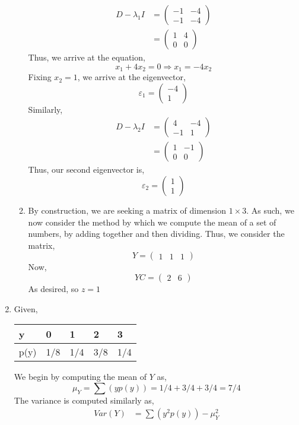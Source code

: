 \documentclass[letterpaper,10pt]{article}
\begin{document}
\begin{enumerate}
\begin{enumerate}
\begin{align*}
D-\lambda_1I &= \begin{pmatrix}
-1 & -4\\
-1 & -4
\end{pmatrix}\\
&= \begin{pmatrix}
1 & 4\\
0 & 0
\end{pmatrix}
\end{align*}
Thus, we arrive at the equation,
\[x_1+4x_2=0\Rightarrow x_1=-4x_2\]
Fixing $x_2=1$, we arrive at the eigenvector,
\[\varepsilon_1=\begin{pmatrix}
-4\\1
\end{pmatrix}\]
Similarly,
\begin{align*}
D-\lambda_2I &= \begin{pmatrix}
4 & -4\\
-1 & 1
\end{pmatrix}\\
&= \begin{pmatrix}
1 & -1\\
0 & 0
\end{pmatrix}
\end{align*}
Thus, our second eigenvector is,
\[\varepsilon_2=\begin{pmatrix}
1\\1
\end{pmatrix}\]
\item By construction, we are seeking a matrix of dimension $1\times 3$. As such, we now consider the method by which we compute the mean of a set of numbers, by adding together and then dividing. Thus, we consider the matrix,
\[Y=\begin{pmatrix}
1 & 1 & 1
\end{pmatrix}\]
Now,
\[YC=\begin{pmatrix}
2 & 6
\end{pmatrix}\]
As desired, so $z=1$
\end{enumerate}
\item Given,
\begin{center}
\begin{tabular}{l|llll}
y & 0 & 1 & 2 & 3\\\hline
p(y) & 1/8 & 1/4 & 3/8 & 1/4
\end{tabular}
\end{center}
We begin by computing the mean of $Y$ as,
\[\mu_Y=\sum(yp(y))=1/4+3/4+3/4=7/4\]
The variance is computed similarly as,
\begin{align*}
Var(Y)&=\sum(y^2p(y))-\mu_Y^2\\

\end{align*}
\end{enumerate}
\end{document}
